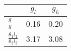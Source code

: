 \begin{tiny}\begin{tabular}{|l|c|c|}
\hline
&\textbf{$g_l$}&\textbf{$g_h$}\\\hline
\textbf{$\frac{g}{y}$}&0.16&0.20\\\hline
\textbf{$\frac{\theta_1 l_1}{\theta_2 l_2}$}&3.17&3.08\\\hline
\end{tabular}
\end{tiny}